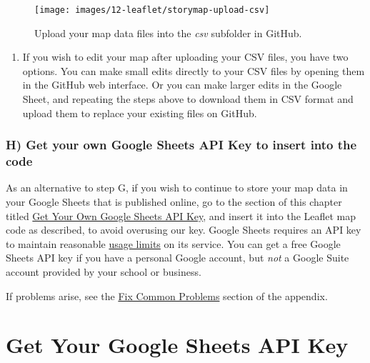 \documentclass[
  english,
]{book}
\providecommand{\tightlist}{%
  \setlength{\itemsep}{0pt}\setlength{\parskip}{0pt}}
\begin{document}
\begin{figure}
\texttt{[image: images/12-leaflet/storymap-upload-csv]} \caption{Upload your map data files into the \emph{csv} subfolder in GitHub.}\label{fig:storymap-upload-csv}
\end{figure}

\begin{enumerate}
\def\labelenumi{\arabic{enumi}.}
\setcounter{enumi}{3}
\tightlist
\item
  If you wish to edit your map after uploading your CSV files, you have two options. You can make small edits directly to your CSV files by opening them in the GitHub web interface. Or you can make larger edits in the Google Sheet, and repeating the steps above to download them in CSV format and upload them to replace your existing files on GitHub.
\end{enumerate}

\hypertarget{h-get-your-own-google-sheets-api-key-to-insert-into-the-code-1}{%
\subsubsection*{H) Get your own Google Sheets API Key to insert into the code}\label{h-get-your-own-google-sheets-api-key-to-insert-into-the-code-1}}

As an alternative to step G, if you wish to continue to store your map data in your Google Sheets that is published online, go to the section of this chapter titled \href{google-sheets-api-key.html}{Get Your Own Google Sheets API Key}, and insert it into the Leaflet map code as described, to avoid overusing our key. Google Sheets requires an API key to maintain reasonable \href{https://developers.google.com/sheets/api/limits}{usage limits} on its service. You can get a free Google Sheets API key if you have a personal Google account, but \emph{not} a Google Suite account provided by your school or business.

If problems arise, see the \href{fix.html}{Fix Common Problems} section of the appendix.

\hypertarget{google-sheets-api-key}{%
\section*{Get Your Google Sheets API Key}\label{google-sheets-api-key}}
\end{document}
